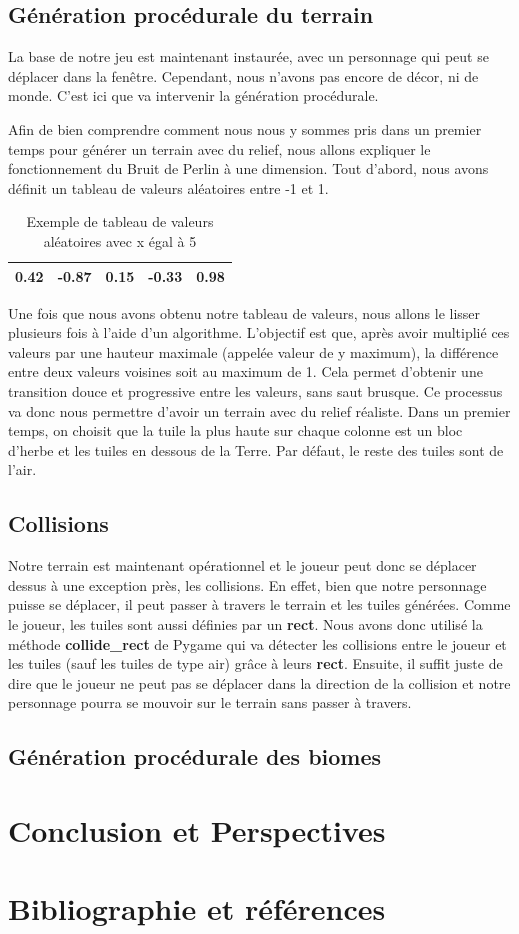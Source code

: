 \documentclass{article}
\begin{document}
\subsection{Génération procédurale du terrain}
La base de notre jeu est maintenant instaurée, avec un personnage qui peut se déplacer dans la fenêtre. Cependant, nous n'avons pas encore de décor, ni de monde. C'est ici que va intervenir la génération procédurale.\par
Afin de bien comprendre comment nous nous y sommes pris dans un premier temps pour générer un terrain avec du relief, nous allons expliquer le fonctionnement du Bruit de Perlin à une dimension. Tout d'abord, nous avons définit un tableau de valeurs aléatoires entre -1 et 1.\par
\begin{table}[h]
  \centering
  \begin{tabular}{|c|c|c|c|c|}
  \hline
  0.42 & -0.87 & 0.15 & -0.33 & 0.98\\
  \hline
  \end{tabular}
  \caption{Exemple de tableau de valeurs aléatoires avec x égal à 5}
  \label{tableau_aleatoire}
  \end{table}
  Une fois que nous avons obtenu notre tableau de valeurs, nous allons le lisser plusieurs fois à l’aide d’un algorithme. L’objectif est que, après avoir multiplié ces valeurs par une hauteur maximale (appelée valeur de y maximum), la différence entre deux valeurs voisines soit au maximum de 1. Cela permet d’obtenir une transition douce et progressive entre les valeurs, sans saut brusque. Ce processus va donc nous permettre d'avoir un terrain avec du relief réaliste. Dans un premier temps, on choisit que la tuile la plus haute sur chaque colonne est un bloc d'herbe et les tuiles en dessous de la Terre. Par défaut, le reste des tuiles sont de l'air.\par
\subsection{Collisions}
  Notre terrain est maintenant opérationnel et le joueur peut donc se déplacer dessus à une exception près, les collisions. En effet, bien que notre personnage puisse se déplacer, il peut passer à travers le terrain et les tuiles générées. Comme le joueur, les tuiles sont aussi définies par un \textbf{rect}. Nous avons donc utilisé la méthode \textbf{collide\_rect} de Pygame qui va détecter les collisions entre le joueur et les tuiles (sauf les tuiles de type air) grâce à leurs \textbf{rect}. Ensuite, il suffit juste de dire que le joueur ne peut pas se déplacer dans la direction de la collision et notre personnage pourra se mouvoir sur le terrain sans passer à travers. \par

  \subsection{Génération procédurale des biomes}
\section{Conclusion et Perspectives}

\section{Bibliographie et références}


\end{document}
